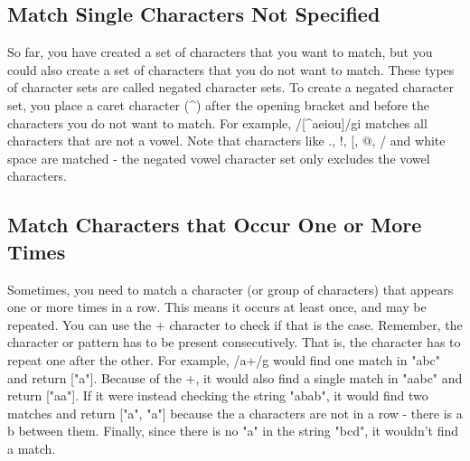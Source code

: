 \documentclass{article}%
\begin{document}
%
\subsection{Match Single Characters Not Specified}%
\label{subsec:MatchSingleCharactersNotSpecified}%
So far, you have created a set of characters that you want to match, but you could also create a set of characters that you do not want to match. These types of character sets are called negated character sets.\newline%
To create a negated character set, you place a caret character (\^{}) after the opening bracket and before the characters you do not want to match.\newline%
For example, /{[}\^{}aeiou{]}/gi matches all characters that are not a vowel. Note that characters like ., !, {[}, @, / and white space are matched {-} the negated vowel character set only excludes the vowel characters.\newline%

%
\subsection{Match Characters that Occur One or More Times}%
\label{subsec:MatchCharactersthatOccurOneorMoreTimes}%
Sometimes, you need to match a character (or group of characters) that appears one or more times in a row. This means it occurs at least once, and may be repeated.\newline%
You can use the + character to check if that is the case. Remember, the character or pattern has to be present consecutively. That is, the character has to repeat one after the other.\newline%
For example, /a+/g would find one match in "abc" and return {[}"a"{]}. Because of the +, it would also find a single match in "aabc" and return {[}"aa"{]}.\newline%
If it were instead checking the string "abab", it would find two matches and return {[}"a", "a"{]} because the a characters are not in a row {-} there is a b between them. Finally, since there is no "a" in the string "bcd", it wouldn't find a match.\newline%

%
\end{document}

